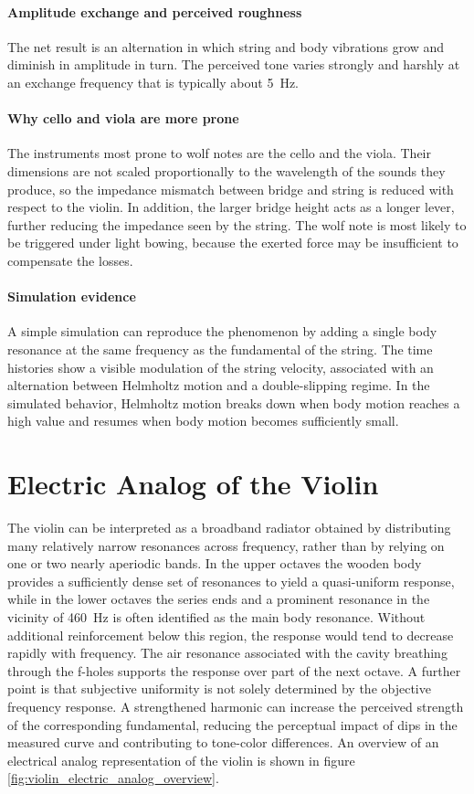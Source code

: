 \paragraph{Amplitude exchange and perceived roughness} The net result is an alternation in which string and body vibrations grow and diminish in amplitude in turn. The perceived tone varies strongly and harshly at an exchange frequency that is typically about \SI{5}{\hertz}.

\paragraph{Why cello and viola are more prone} The instruments most prone to wolf notes are the cello and the viola. Their dimensions are not scaled proportionally to the wavelength of the sounds they produce, so the impedance mismatch between bridge and string is reduced with respect to the violin. In addition, the larger bridge height acts as a longer lever, further reducing the impedance seen by the string. The wolf note is most likely to be triggered under light bowing, because the exerted force may be insufficient to compensate the losses.

\paragraph{Simulation evidence} A simple simulation can reproduce the phenomenon by adding a single body resonance at the same frequency as the fundamental of the string. The time histories show a visible modulation of the string velocity, associated with an alternation between Helmholtz motion and a double-slipping regime. In the simulated behavior, Helmholtz motion breaks down when body motion reaches a high value and resumes when body motion becomes sufficiently small.

\section{Electric Analog of the Violin}

The violin can be interpreted as a broadband radiator obtained by distributing many relatively narrow resonances across frequency, rather than by relying on one or two nearly aperiodic bands. In the upper octaves the wooden body provides a sufficiently dense set of resonances to yield a quasi-uniform response, while in the lower octaves the series ends and a prominent resonance in the vicinity of \SI{460}{\hertz} is often identified as the main body resonance. Without additional reinforcement below this region, the response would tend to decrease rapidly with frequency. The air resonance associated with the cavity breathing through the f-holes supports the response over part of the next octave. A further point is that subjective uniformity is not solely determined by the objective frequency response. A strengthened harmonic can increase the perceived strength of the corresponding fundamental, reducing the perceptual impact of dips in the measured curve and contributing to tone-color differences. An overview of an electrical analog representation of the violin is shown in figure \ref{fig:violin_electric_analog_overview}. 

